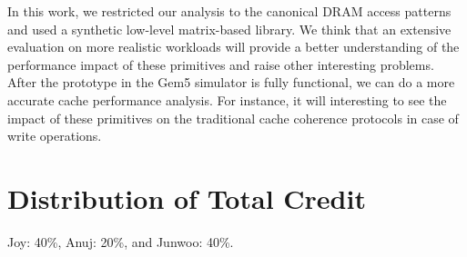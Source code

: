\documentclass[letterpaper]{article}
\begin{document}
In this work, we restricted our analysis to the canonical DRAM access patterns
and used a synthetic low-level matrix-based library. We think that an
extensive evaluation on more realistic workloads will provide a better 
understanding of the performance impact of these primitives and raise 
other interesting problems. After the prototype in the Gem5 simulator is
fully functional, we can do a more accurate cache performance analysis.
For instance, it will interesting to see the impact of these primitives on
the traditional cache coherence protocols in case of write operations.

\section{Distribution of Total Credit}

Joy: 40\%, Anuj: 20\%, and Junwoo: 40\%.



\end{document}
